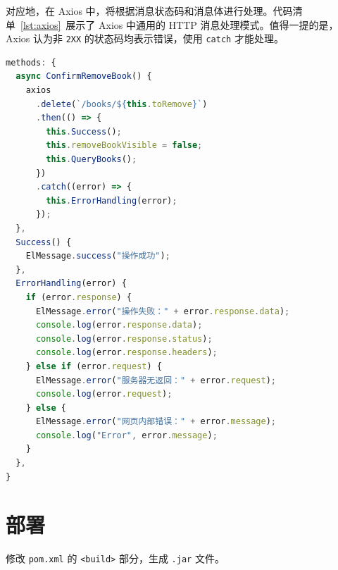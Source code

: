 \documentclass[a4paper,oneside]{ctexbook}
\begin{document}
对应地，在 Axios 中，将根据消息状态码和消息体进行处理。代码清单~\ref{lst:axios}~展示了 Axios 中通用的 HTTP 消息处理模式。值得一提的是，Axios 认为非 \verb|2XX| 的状态码均表示错误，使用 \verb|catch| 才能处理。

\begin{lstlisting}[language=javascript, caption=Axios,label=lst:axios]
methods: {
  async ConfirmRemoveBook() {
    axios
      .delete(`/books/${this.toRemove}`)
      .then(() => {
        this.Success();
        this.removeBookVisible = false;
        this.QueryBooks();
      })
      .catch((error) => {
        this.ErrorHandling(error);
      });
  },
  Success() {
    ElMessage.success("操作成功");
  },
  ErrorHandling(error) {
    if (error.response) {
      ElMessage.error("操作失败：" + error.response.data);
      console.log(error.response.data);
      console.log(error.response.status);
      console.log(error.response.headers);
    } else if (error.request) {
      ElMessage.error("服务器无返回：" + error.request);
      console.log(error.request);
    } else {
      ElMessage.error("网页内部错误：" + error.message);
      console.log("Error", error.message);
    }
  },
}
\end{lstlisting}

\section{部署}

修改 \verb|pom.xml| 的 \verb|<build>| 部分，生成 \verb|.jar| 文件。
\end{document}
